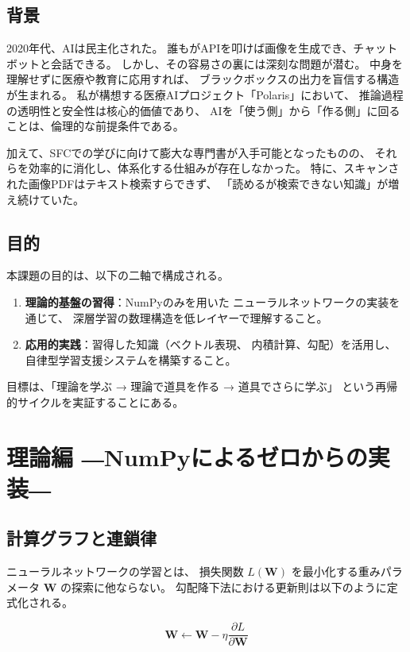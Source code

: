 \documentclass[uplatex, dvipdfmx, a4paper, 11pt]{jsarticle}
\begin{document}
\subsection{背景}
2020年代、AIは民主化された。
誰もがAPIを叩けば画像を生成でき、チャットボットと会話できる。
しかし、その容易さの裏には深刻な問題が潜む。
中身を理解せずに医療や教育に応用すれば、
ブラックボックスの出力を盲信する構造が生まれる。
私が構想する医療AIプロジェクト「Polaris」において、
推論過程の透明性と安全性は核心的価値であり、
AIを「使う側」から「作る側」に回ることは、倫理的な前提条件である。

加えて、SFCでの学びに向けて膨大な専門書が入手可能となったものの、
それらを効率的に消化し、体系化する仕組みが存在しなかった。
特に、スキャンされた画像PDFはテキスト検索すらできず、
「読めるが検索できない知識」が増え続けていた。

\subsection{目的}
本課題の目的は、以下の二軸で構成される。

\begin{enumerate}
    \item \textbf{理論的基盤の習得}：NumPyのみを用いた
          ニューラルネットワークの実装を通じて、
          深層学習の数理構造を低レイヤーで理解すること。
    \item \textbf{応用的実践}：習得した知識（ベクトル表現、
          内積計算、勾配）を活用し、自律型学習支援システムを構築すること。
\end{enumerate}

目標は、「理論を学ぶ → 理論で道具を作る → 道具でさらに学ぶ」
という再帰的サイクルを実証することにある。


\section{理論編 ―NumPyによるゼロからの実装―}

\subsection{計算グラフと連鎖律}
ニューラルネットワークの学習とは、
損失関数 $L(\bm{W})$ を最小化する重みパラメータ $\bm{W}$ の探索に他ならない。
勾配降下法における更新則は以下のように定式化される。

\begin{equation}
    \bm{W} \leftarrow \bm{W} - \eta \frac{\partial L}{\partial \bm{W}}
    \label{eq:gradient_descent}
\end{equation}
\end{document}
